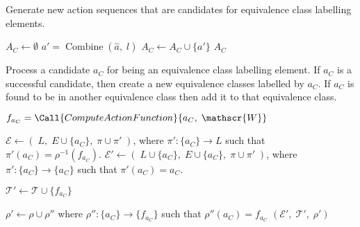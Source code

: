 \begin{algorithm}[H]
	\caption{
		Generate new action sequences that are candidates for equivalence class labelling elements.
	}
	\hrulefill
	\begin{algorithmic}[1]
		\State $A_{C} \gets \emptyset$
		\State $a' = \operatorname{Combine}(\hat{a}, \; l)$
		\State $A_{C} \gets A_{C} \cup \{a'\}$
		\EndFor
		\State \Return $A_{C}$
		\EndProcedure
	\end{algorithmic}
\end{algorithm}


\begin{algorithm}[H]
	\caption{
		Process a candidate $a_{C}$ for being an equivalence class labelling element.
		If $a_{C}$ is a successful candidate, then create a new equivalence classes labelled by $a_{C}$.
		If $a_{C}$ is found to be in another equivalence class then add it to that equivalence class.
	}
	\hrulefill
	\begin{algorithmic}[1]
		\State $f_{a_{C}} = \Call{ComputeActionFunction}{a_{C}, \; \mathscr{W}}$

		\Statex {}
		\State $\mathcal{E} \gets (\; L, \; E \cup \{a_{C}\}, \; \pi \cup \pi' \;)$, where $\pi': \{a_{C}\} \to L$ such that $\pi'(a_{C}) = \rho^{-1}(f_{a_{C}})$.
		\Else
		\Statex {}
		\State $\mathcal{E}' \gets (\; L \cup \{a_{C}\}, \; E \cup \{a_{C}\}, \; \pi \cup \pi' \;)$, where $\pi': \{a_{C}\} \to \{a_{C}\}$ such that $\pi'(a_{C}) = a_{C}$.

		\Statex {}
		\State $\mathcal{T}' \gets \mathcal{T} \cup \{f_{a_{C}}\}$

		\Statex {}
		\State $\rho' \gets \rho \cup \rho''$ where $\rho'': \{a_{C}\} \to \{f_{a_{C}}\}$ such that $\rho''(a_{C}) = f_{a_{C}}$
		\EndIf
		\State \Return $(\mathcal{E}', \; \mathcal{T}', \; \rho')$
		\EndProcedure
	\end{algorithmic}
\end{algorithm}



